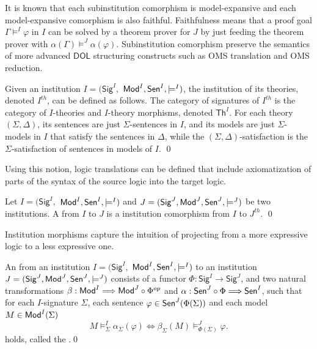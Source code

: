 \documentclass[10pt, a4paper]{isov2}
\newcommand{\Sig}{\mathsf{Sig}}
\renewcommand{\Th}{\mathsf{Th}}
\newcommand*{\DOL}{\ensuremath{\mathsf{DOL}}\xspace}
\begin{document}
It is known that each subinstitution comorphism is model-expansive and 
each model-expansive comorphism
is also faithful.
Faithfulness means that a proof goal $\Gamma\models^I\varphi$
in $I$ can be solved by a theorem prover for $J$ by just feeding the
theorem prover with $\alpha(\Gamma)\models^J\alpha(\varphi)$.
Subinstitution comorphism preserve
the semantics of more advanced \DOL structuring constructs such
as OMS translation and OMS reduction.


\begin{definition}
  Given an institution  $I = (\Sig^I,$ $ \mathsf{Mod}^I, \mathsf{Sen}^I, \models^I)$, the
   institution of its theories, denoted $I^{th}$, can be defined as follows. The category of signatures of $I^{th}$ is the category
   of $I$-theories and $I$-theory morphisms, denoted $\Th^I$.
   For each theory $(\Sigma, \Delta)$, its sentences are just $\Sigma$-sentences in $I$, and
   its models are just $\Sigma$-models in $I$ that satisfy the sentences in $\Delta$, while the
   $(\Sigma,\Delta)$-satisfaction is the $\Sigma$-satisfaction of sentences in models of $I$.
\qed \end{definition}

Using this notion, logic translations can be defined that include axiomatization of parts of the
syntax of the source logic into the target logic.

\begin{definition}

 Let $I = (\Sig^I,$ $ \mathsf{Mod}^I, \mathsf{Sen}^I, \models^I)$ and $J = (\Sig^J, \Mod^J,
\Sen^J, \models^J)$ be two institutions. A  from $I$ to
$J$ is a institution comorphism from $I$ to $J^{th}$.
\qed\end{definition}

\medskip

Institution morphisms capture the intuition of projecting from a more expressive logic to a less expressive one.

\begin{definition} 
An  from an institution $I = (\Sig^I,$ $ \mathsf{Mod}^I, \mathsf{Sen}^I, \models^I)$ to
an institution $J = (\Sig^J, \Mod^J,
\Sen^J, \models^J)$ consists of a functor $\Phi : \Sig^I \longrightarrow \Sig^J$, and two
natural transformations $\beta: \mathsf{Mod}^I \Longrightarrow \mathsf{Mod}^J \circ \Phi^{op}$
and $\alpha:  \mathsf{Sen}^J \circ \Phi \Longrightarrow \mathsf{Sen}^I $, such that for each $I$-signature $\Sigma$, each sentence $\varphi\in\mathsf{Sen}^J(\Phi(\Sigma))$ and each model $M\in\mathsf{Mod}^I(\Sigma)$
%
\begin{equation*}
  M\models^{I}_{\Sigma}\alpha_{\Sigma}(\varphi)
\iff
  \beta_{\Sigma}(M)\models^J_{\Phi(\Sigma)}\varphi.
\end{equation*}
holds, called the .\quad\qed
\end{definition}
\end{document}
